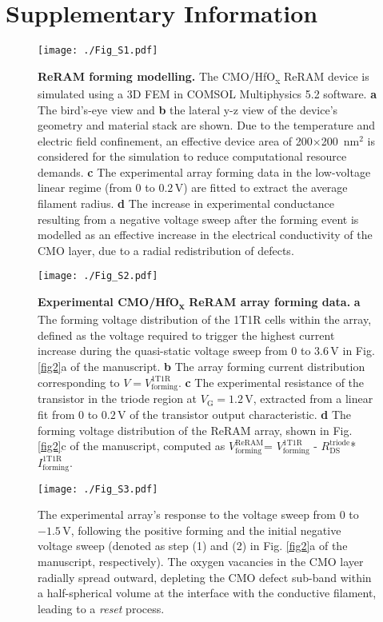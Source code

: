 \section*{Supplementary Information}%
\begin{figure}[H]
\centering
\texttt{[image: ./Fig\_S1.pdf]}
\caption{\textbf{ReRAM forming modelling.} The CMO/HfO\textsubscript{\textnormal{x}} ReRAM device is simulated using a 3D FEM in COMSOL Multiphysics 5.2 software. \textbf{a} The bird’s-eye view and \textbf{b} the lateral y-z view of the device’s geometry and material stack are shown. Due to the temperature and electric field confinement, an effective device area of 200$\times$200~nm$^2$ is considered for the simulation to reduce computational resource demands. \textbf{c} The experimental array forming data in the low-voltage linear regime (from 0 to \(0.2 \,\mathrm{V}\)) are fitted to extract the average filament radius. \textbf{d} The increase in experimental conductance resulting from a negative voltage sweep after the forming event is modelled as an effective increase in the electrical conductivity of the CMO layer, due to a radial redistribution of defects.}
\label{figS1}
\end{figure}

\begin{figure}[H]
\centering
\texttt{[image: ./Fig\_S2.pdf]}
\caption{\textbf{Experimental CMO/HfO\textsubscript{\textnormal{x}} ReRAM array forming data.} \textbf{a} The forming voltage distribution of the 1T1R cells within the array, defined as the voltage required to trigger the highest current increase during the quasi-static voltage sweep from 0 to \(3.6 \,\mathrm{V}\) in Fig. \ref{fig2}a of the manuscript. \textbf{b} The array forming current distribution corresponding to \( V = V_{\mathrm{forming}}^{\mathrm{1T1R}} \). \textbf{c} The experimental resistance of the transistor in the triode region at \(V_\mathrm{G} = \mathrm{1.2 \, V}\), extracted from a linear fit from 0 to \(0.2 \,\mathrm{V}\) of the transistor output characteristic. \textbf{d} The forming voltage distribution of the ReRAM array, shown in Fig. \ref{fig2}c of the manuscript, computed as \(V_{\mathrm{forming}}^{\mathrm{ReRAM}} \)=  \(V_{\mathrm{forming}}^{\mathrm{1T1R}} \) - \(R_{\mathrm{DS}}^{\mathrm{triode}} \)* \(I_{\mathrm{forming}}^{\mathrm{1T1R}} \).}
\label{figS2}
\end{figure}

\begin{figure}[H]
\centering
\texttt{[image: ./Fig\_S3.pdf]}
\caption{The experimental array’s response to the voltage sweep from 0 to \(-1.5 \,\mathrm{V}\), following the positive forming and the initial negative voltage sweep (denoted as step (1) and (2) in Fig. \ref{fig2}a of the manuscript, respectively). The oxygen vacancies in the CMO layer radially spread outward, depleting the CMO defect sub-band within a half-spherical volume at the interface with the conductive filament, leading to a \textit{reset} process.}
\label{figS3}
\end{figure}

